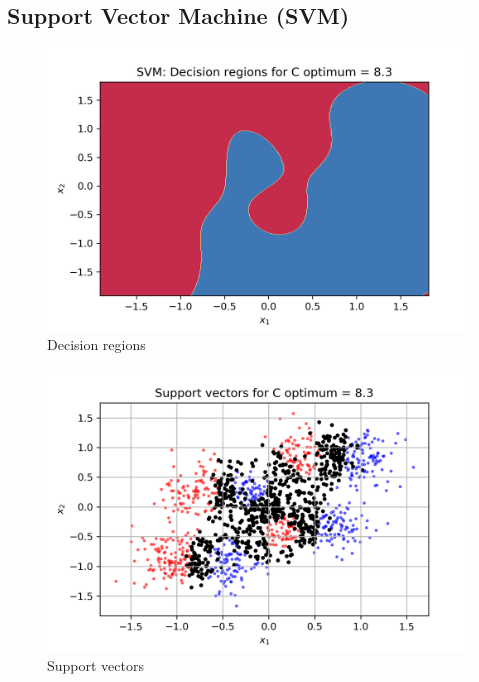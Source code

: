 \documentclass[a4paper]{article}    %
\begin{document}
\newpage
\subsection{Support Vector Machine (SVM)}

\begin{figure}[H]
    \centering
    \includegraphics[width=12cm]{svm_decision_region}
    \caption{Decision regions}
    \label{fig:svm-decision_regions}
\end{figure}

\begin{figure}[H]
    \centering
    \includegraphics[width=12cm]{support_vectors}
    \caption{Support vectors}
    \label{fig:svm-support_vectors}
\end{figure}


\end{document}
